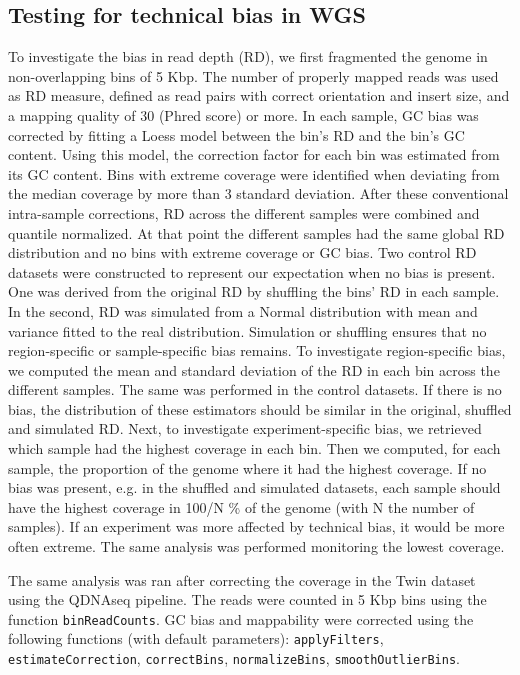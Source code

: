 \subsection*{Testing for technical bias in WGS}
To investigate the bias in read depth (RD), we first fragmented the genome in non-overlapping bins of 5 Kbp. The number of properly mapped reads was used as RD measure, defined as read pairs with correct orientation and insert size, and a mapping quality of 30 (Phred score) or more. In each sample, GC bias was corrected by fitting a Loess model between the bin's RD and the bin's GC content. Using this model, the correction factor for each bin was estimated from its GC content. Bins with extreme coverage were identified when deviating from the median coverage by more than 3 standard deviation. After these conventional intra-sample corrections, RD across the different samples were combined and quantile normalized. At that point the different samples had the same global RD distribution and no bins with extreme coverage or GC bias. Two control RD datasets were constructed to represent our expectation when no bias is present. One was derived from the original RD by shuffling the bins' RD in each sample. In the second, RD was simulated from a Normal distribution with mean and variance fitted to the real distribution. Simulation or shuffling ensures that no region-specific or sample-specific bias remains. To investigate region-specific bias, we computed the mean and standard deviation of the RD in each bin across the different samples. The same was performed in the control datasets. If there is no bias, the distribution of these estimators should be similar in the original, shuffled and simulated RD. Next, to investigate experiment-specific bias, we retrieved which sample had the highest coverage in each bin. Then we computed, for each sample, the proportion of the genome where it had the highest coverage. If no bias was present, e.g. in the shuffled and simulated datasets, each sample should have the highest coverage in 100/N \% of the genome (with N the number of samples). If an experiment was more affected by technical bias, it would be more often extreme. The same analysis was performed monitoring the lowest coverage.

The same analysis was ran after correcting the coverage in the Twin dataset using the {\sf QDNAseq} pipeline\cite{Scheinin2014}.
The reads were counted in 5 Kbp bins using the function \verb!binReadCounts!.
GC bias and mappability were corrected using the following functions (with default parameters): \verb!applyFilters!, \verb!estimateCorrection!, \verb!correctBins!, \verb!normalizeBins!, \verb!smoothOutlierBins!.

